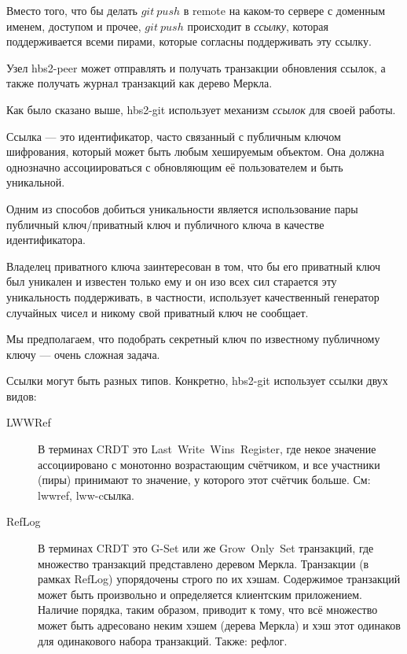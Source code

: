 \documentclass[11pt,a4paper]{article}
\newcommand{\term}[2]{\textit{#2}}
\begin{document}
Вместо того, что бы делать $git~push$ в remote на каком-то сервере с доменным именем, доступом и
прочее, $git~push$ происходит в \term{references}{ссылку}, которая поддерживается всеми пирами,
которые согласны поддерживать эту ссылку.

Узел hbs2-peer может отправлять и получать транзакции обновления ссылок, а также получать журнал
транзакций как дерево Меркла.

Как было сказано выше, hbs2-git использует механизм \term{references}{ссылок} для своей работы.

Ссылка --- это идентификатор, часто связанный с публичным ключом шифрования, который может быть
любым хешируемым объектом. Она должна однозначно ассоциироваться с обновляющим её пользователем и
быть уникальной.

Одним из способов добиться уникальности является использование пары публичный
ключ/приватный ключ и публичного ключа в качестве идентификатора.

Владелец приватного ключа заинтересован в том, что бы его приватный ключ был уникален и известен
только ему и он изо всех сил старается эту уникальность поддерживать, в частности, использует
качественный генератор случайных чисел и никому свой приватный ключ не сообщает.

Мы предполагаем, что подобрать секретный ключ по известному публичному ключу --- очень
сложная задача.

Ссылки могут быть разных типов.  Конкретно, hbs2-git использует ссылки двух видов:

\begin{description}
  \item[LWWRef] В терминах CRDT это Last~Write~Wins~Register, где некое значение
    ассоциировано с монотонно возрастающим счётчиком, и все участники (пиры) принимают
    то значение, у которого этот счётчик больше. См: lwwref, lww-cсылка.

  \item[RefLog] В терминах CRDT это G-Set или же Grow~Only~Set транзакций, где множество
    транзакций представлено деревом Меркла. Транзакции (в рамках RefLog) упорядочены строго
    по их хэшам. Содержимое транзакций может быть произвольно и определяется клиентским приложением.
    Наличие порядка, таким образом, приводит к тому, что всё множество может быть адресовано
    неким хэшем (дерева Меркла) и хэш этот одинаков для одинакового набора транзакций. Также:
    рефлог.
\end{description}
\end{document}
